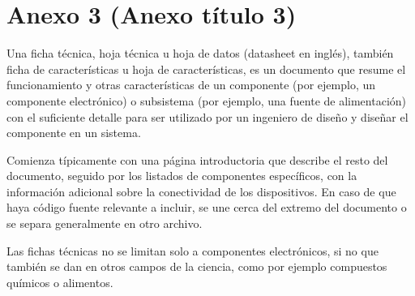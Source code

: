 \chapter{Anexo 3 (Anexo título 3)}\label{anexo3}

Una ficha técnica, hoja técnica u hoja de datos (datasheet en inglés), también ficha de características u hoja de características, es un documento que resume el funcionamiento y otras características de un componente (por ejemplo, un componente electrónico) o subsistema (por ejemplo, una fuente de alimentación) con el suficiente detalle para ser utilizado por un ingeniero de diseño y diseñar el componente en un sistema.

Comienza típicamente con una página introductoria que describe el resto del documento, seguido por los listados de componentes específicos, con la información adicional sobre la conectividad de los dispositivos. En caso de que haya código fuente relevante a incluir, se une cerca del extremo del documento o se separa generalmente en otro archivo.

Las fichas técnicas no se limitan solo a componentes electrónicos, si no que también se dan en otros campos de la ciencia, como por ejemplo compuestos químicos o alimentos.

\bigskip





\endinput 